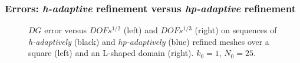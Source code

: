\begin{frame}[fragile]
    \frametitle{Errors: \textit{h-adaptive} refinement versus \textit{hp-adaptive} refinement}

    \begin{figure}[!ht]
        
        \caption{$DG$ error versus $DOFs^{1/2}$ (left) and $DOFs^{1/3}$ (right) on sequences of \textit{h-adaptively} (black) and \textit{hp-adaptively} (blue) refined meshes over a square (left) and an L-shaped domain (right). $k_0 = 1$, $N_0 = 25$.}
    \end{figure}
\end{frame}